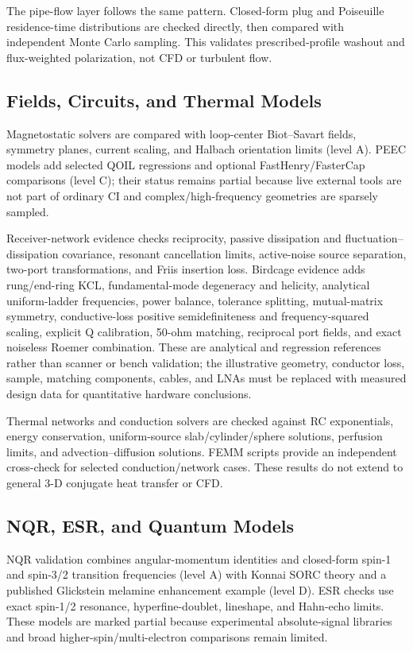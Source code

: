 \documentclass[11pt,oneside]{report}
\begin{document}
The pipe-flow layer follows the same pattern. Closed-form plug and Poiseuille
residence-time distributions are checked directly, then compared with independent
Monte Carlo sampling. This validates prescribed-profile washout and
flux-weighted polarization, not CFD or turbulent flow.

\subsection{Fields, Circuits, and Thermal Models}

Magnetostatic solvers are compared with loop-center Biot--Savart fields, symmetry
planes, current scaling, and Halbach orientation limits (level A). PEEC models
add selected QOIL regressions and optional FastHenry/FasterCap comparisons
(level C); their status remains partial because live external tools are not part
of ordinary CI and complex/high-frequency geometries are sparsely sampled.

Receiver-network evidence checks reciprocity, passive dissipation and
fluctuation--dissipation covariance, resonant cancellation limits, active-noise
source separation, two-port transformations, and Friis insertion loss. Birdcage
evidence adds rung/end-ring KCL, fundamental-mode degeneracy and helicity,
analytical uniform-ladder frequencies, power balance, tolerance splitting,
mutual-matrix symmetry, conductive-loss positive semidefiniteness and
frequency-squared scaling, explicit Q calibration, 50-ohm matching, reciprocal
port fields, and exact noiseless Roemer combination. These are analytical and
regression references rather than scanner or bench validation; the illustrative
geometry, conductor loss, sample, matching components, cables, and LNAs must be
replaced with measured design data for quantitative hardware conclusions.

Thermal networks and conduction solvers are checked against RC exponentials,
energy conservation, uniform-source slab/cylinder/sphere solutions, perfusion
limits, and advection--diffusion solutions. FEMM scripts provide an independent
cross-check for selected conduction/network cases. These results do not extend
to general 3-D conjugate heat transfer or CFD.

\subsection{NQR, ESR, and Quantum Models}

NQR validation combines angular-momentum identities and closed-form spin-1 and
spin-3/2 transition frequencies (level A) with Konnai SORC theory and a published
Glickstein melamine enhancement example (level D). ESR checks use exact
spin-1/2 resonance, hyperfine-doublet, lineshape, and Hahn-echo limits. These
models are marked partial because experimental absolute-signal libraries and
broad higher-spin/multi-electron comparisons remain limited.
\end{document}
